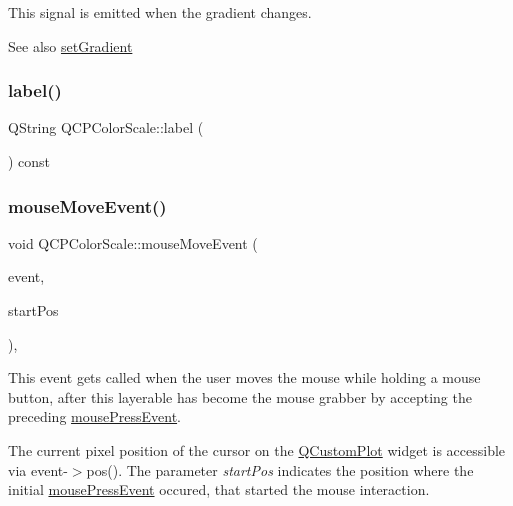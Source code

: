 This signal is emitted when the gradient changes.

\begin{DoxySeeAlso}{See also}
\mbox{\hyperlink{class_q_c_p_color_scale_a1f29583bb6f1e7f473b62fb712be3940}{set\+Gradient}} 
\end{DoxySeeAlso}
\mbox{\label{class_q_c_p_color_scale_a3dbac1121a90172d62f01ab80b1ad641}} 
\subsubsection{\texorpdfstring{label()}{label()}}
{\footnotesize\ttfamily Q\+String Q\+C\+P\+Color\+Scale\+::label (\begin{DoxyParamCaption}{ }\end{DoxyParamCaption}) const}

\mbox{\label{class_q_c_p_color_scale_a3b2bd79725aefaf2630fc76e90939442}} 
\subsubsection{\texorpdfstring{mouseMoveEvent()}{mouseMoveEvent()}}
{\footnotesize\ttfamily void Q\+C\+P\+Color\+Scale\+::mouse\+Move\+Event (\begin{DoxyParamCaption}\item[{Q\+Mouse\+Event $\ast$}]{event,  }\item[{const Q\+PointF \&}]{start\+Pos }\end{DoxyParamCaption})\hspace{0.3cm}{\ttfamily [protected]}, {\ttfamily [virtual]}}

This event gets called when the user moves the mouse while holding a mouse button, after this layerable has become the mouse grabber by accepting the preceding \mbox{\hyperlink{class_q_c_p_color_scale_a91f633b97ffcd57fdf8cd814974c20e6}{mouse\+Press\+Event}}.

The current pixel position of the cursor on the \mbox{\hyperlink{class_q_custom_plot}{Q\+Custom\+Plot}} widget is accessible via {\ttfamily event-\/$>$pos()}. The parameter {\itshape start\+Pos} indicates the position where the initial \mbox{\hyperlink{class_q_c_p_color_scale_a91f633b97ffcd57fdf8cd814974c20e6}{mouse\+Press\+Event}} occured, that started the mouse interaction.

